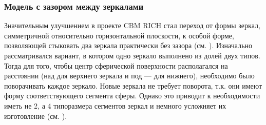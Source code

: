 \subsubsection{Модель с зазором между зеркалами}\label{sec:secMirrorsEvolution}

Значительным улучшением в проекте CBM RICH стал переход от формы зеркал, симметричной относительно горизонтальной плоскости, к особой форме, позволяющей стыковать два зеркала практически без зазора (см. ). Изначально рассматривался вариант, в котором одно зеркало выполнено из долей двух типов. Тогда для того, чтобы центр сферической поверхности располагался на расстоянии (над для верхнего зеркала и под --- для нижнего), необходимо было поворачивать каждое зеркало. Новые зеркала не требует поворота, т.к. они имеют форму соответствующего сегмента сферы. Однако это приводит к необходимости иметь не 2, а 4 типоразмера сегментов зеркал и немного усложняет их изготовление (см. ).

